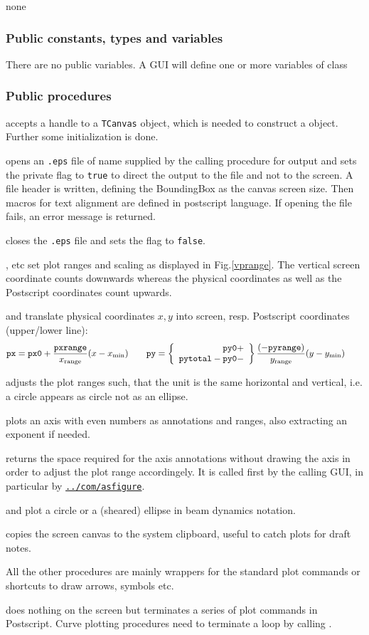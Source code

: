 \documentclass[12pt]{article}
\newcommand\code[1]{{\tt #1}}
\newcommand\guifco[1]{{\color{violet}\code{#1}}}
\newcommand{\opaguif}[1]{\colorbox{violet!30}{\code{#1}}}
\newcommand{\oguif}[1]{\hyperref[#1]{\opaguif{#1}}}
\newcommand{\uses}[1]{\flushleft {\bf Uses:} #1}
\newcommand{\pvar}[1]{\subsubsection*{Public constants, types and variables} #1}
\newcommand{\ppro}[1]{\subsubsection*{Public procedures} #1}
\begin{document}
\uses{none}

\pvar{
There are no public variables. A GUI will define one or more variables of class \guifco{Vplot}
}

\ppro{
\guifco{Create} accepts a handle to a \code{TCanvas} object, which is needed to construct a \guifco{Vplot} object. Further some initialization is done.

\guifco{PS\_start} opens an \code{*.eps} file of name \guifco{psfile} supplied by the calling procedure for output and sets the private flag \guifco{PS} to \code{true} to direct the output to the file and not to the screen. A file header is written, defining the BoundingBox as the canvas screen size. Then macros for text alignment are defined in postscript language. If opening the file fails, an error message is returned.

\guifco{PS\_stop} closes the \code{*.eps} file and sets the flag \guifco{PS} to \code{false}.

\guifco{SetRange*}, \guifco{SetMargin*} etc set plot ranges and scaling as displayed in Fig.\ref{vprange}. The vertical screen coordinate counts downwards whereas the physical coordinates as well as the Postscript coordinates count upwards. 

\guifco{getpx,getpy} and \guifco{PS\_getpxr,PS\_getpyr} translate physical coordinates $x,y$ into screen, resp. Postscript coordinates (upper/lower line):
\[
{\tt px}={\tt px0}+\frac{\tt pxrange}{x_{\rm range}} (x-x_{\rm min}) \qquad
{\tt py}=\left\{ \begin{array}{r} {\tt py0} + \\ {\tt pytotal} - {\tt py0} -  \end{array} \right\} \frac{(-{\tt pyrange})}{y_{\rm range}} (y-y_{\rm min}) \qquad
\]

\guifco{AdjustAspectRatio} adjusts the plot ranges such, that the unit is the same horizontal and vertical, i.e. a circle appears as circle not as an ellipse.

\guifco{Axis} plots an axis with even numbers as annotations and ranges, also extracting an exponent if needed. 

\guifco{GetAxisSpace} returns the space required for the axis annotations without drawing the axis in order to adjust the plot range accordingely. It is called first by the calling GUI, in particular by \oguif{../com/asfigure}.

\guifco{Circle} and \guifco{Ellipse} plot a circle or a (sheared) ellipse in beam dynamics notation.

\guifco{GrabImage} copies the screen canvas to the system clipboard, useful to catch plots for draft notes.

All the other procedures are mainly wrappers for the standard plot commands or shortcuts to draw arrows, symbols etc.

\guifco{Stroke} does nothing on the screen but terminates a series of plot commands in Postscript. Curve plotting procedures need to terminate a \guifco{LineTo...} loop by calling \guifco{stroke}.
}
\end{document}

